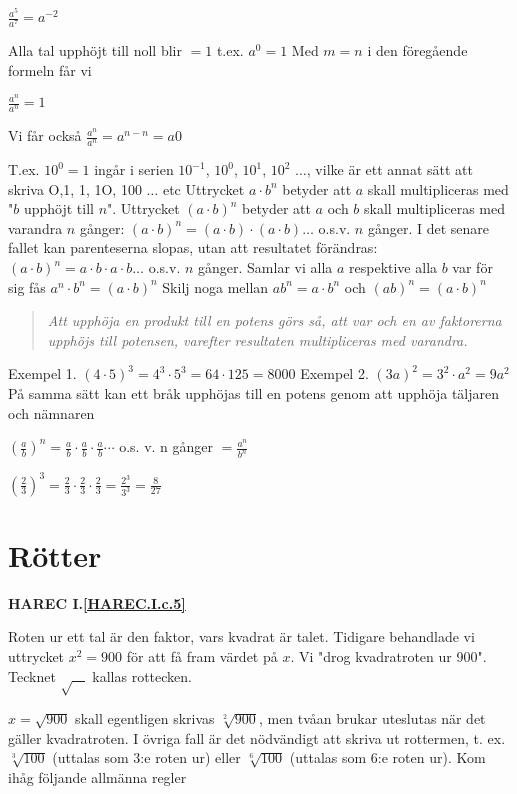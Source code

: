 \(\frac{a^5}{a^7} = a^{-2}\)

Alla tal upphöjt till noll blir \(= 1\) t.ex. \(a^0 = 1\)
Med \(m = n\) i den föregående formeln får vi

\(\frac{a^n}{a^n} = 1\)

Vi får också \(\frac{a^n}{a^n} = a^{n-n} =a0\)

T.ex. \(10^0 = 1\) ingår i serien \(10^{-1}\), \(10^0\), \(10^1\), \(10^2\) \(\ldots\), vilke
är ett annat sätt att skriva O,1, 1, 1O, 100 \(\ldots\) etc
Uttrycket \(a \cdot b^n\) betyder att \(a\) skall multipliceras med "\(b\) upphöjt
till \(n\)".
Uttrycket \((a \cdot b)^n\) betyder att \(a\) och \(b\) skall multipliceras med
varandra \(n\) gånger:
\((a \cdot b)^n = (a \cdot b) \cdot (a \cdot b) \ldots \) o.s.v. \(n\) gånger.
I det senare fallet kan parenteserna slopas, utan att resultatet förändras:
\((a \cdot b)^n = a \cdot b \cdot a \cdot b \ldots\) o.s.v. \(n\) gånger.
Samlar vi alla \(a\) respektive alla \(b\) var för sig fås \(a^n \cdot b^n = (a \cdot b)^n\)
Skilj noga mellan \(ab^n = a \cdot b^n\)
och \((ab)^n = (a \cdot b)^n\)

\begin{quote}\emph{
Att upphöja en produkt till en potens görs så, att var och en av faktorerna
upphöjs till potensen, varefter resultaten multipliceras med varandra.
}\end{quote}

Exempel 1. \((4 \cdot 5)^3 = 4^3 \cdot 5^3 = 64 \cdot 125 = 8000\)
Exempel 2. \((3a)^2 = 3^2 \cdot a^2 = 9a^2\)
På samma sätt kan ett bråk upphöjas till en potens genom att upphöja täljaren
och nämnaren

\(\left(\frac{a}{b}\right)^n = \frac{a}{b} \cdot \frac{a}{b} \cdot \frac{a}{b} \cdots\) o.s. v. n gånger \(= \frac{a^n}{b^n}\)

\(\left(\frac{2}{3}\right)^3 = \frac{2}{3} \cdot \frac{2}{3} \cdot \frac{2}{3} =  \frac{2^3}{3^3} = \frac{8}{27}\)

\section{Rötter}
\textbf{HAREC I.\ref{HAREC.I.c.5}\label{myHAREC.I.c.5}}

Roten ur ett tal är den faktor, vars kvadrat är talet.
Tidigare behandlade vi uttrycket \(x^2 = 900\) för att få fram värdet på \(x\). Vi
"drog kvadratroten ur 900".
Tecknet \(\sqrt{\ \ \ \ }\) kallas rottecken.

\(x = \sqrt{900}\) skall egentligen skrivas \(\sqrt[2]{900}\),
men tvåan brukar uteslutas när det gäller kvadratroten. I övriga fall är det
nödvändigt att skriva ut rottermen, t. ex. \(\sqrt[3]{100}\) (uttalas
som 3:e roten ur) eller \(\sqrt[6]{100}\) (uttalas som 6:e roten ur).
Kom ihåg följande allmänna regler

